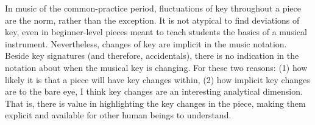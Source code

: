 

In music of the common-practice period, fluctuations of key
throughout a piece are the norm, rather than the exception.
It is not atypical to find deviations of key, even in
beginner-level pieces meant to teach students the basics of
a musical instrument. Nevertheless, changes of key are
implicit in the music notation. Beside key signatures (and
therefore, accidentals), there is no indication in the
notation about when the musical key is changing. For these
two reasons: (1) how likely it is that a piece will have key
changes within, (2) how implicit key changes are to the bare
eye, I think key changes are an interesting analytical
dimension. That is, there is value in highlighting the key
changes in the piece, making them explicit and available for
other human beings to understand.

